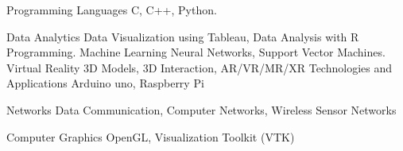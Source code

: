 

\begin{cvskills}

  \cvskill
    {Programming Languages} %
    {C, C++, Python.} %

  \cvskill
    {Data Analytics} %
    {Data Visualization using Tableau, Data Analysis with R Programming.} %
  \cvskill
    {Machine Learning} %
    {Neural Networks, Support Vector Machines. } %
  \cvskill
    {Virtual Reality} %
    {3D Models, 3D Interaction, AR/VR/MR/XR Technologies and Applications } %
  \cvskill
    {} %
    {Arduino uno, Raspberry Pi } %

    \cvskill
    {Networks} %
     {Data Communication, Computer Networks, Wireless Sensor Networks} %

  \cvskill
    {Computer Graphics} %
    {OpenGL, Visualization Toolkit (VTK)} %
    
\end{cvskills}